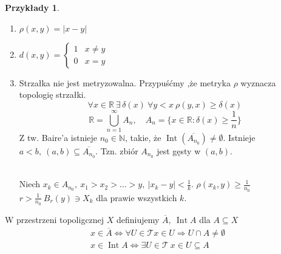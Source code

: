 \documentclass[twoside,10pt]{article}
\theoremstyle{definition}
\theoremstyle{definition}
\theoremstyle{definition}
\theoremstyle{definition}
\theoremstyle{remark}
\theoremstyle{definition}
\theoremstyle{definition}
\theoremstyle{definition}
\theoremstyle{definition}
\theoremstyle{definition}
\newtheorem*{przy}{Przykłady}
\theoremstyle{definition}
\begin{document}
\begin{przy} \hfill
    \begin{enumerate}[(1)]
        \item $\rho (x,y) = |x-y|$
        \item $d(x,y) = \begin{cases} 1 & x \neq y \\ 0 &x = y \end{cases}$
        \item Strzałka nie jest metryzowalna. Przypuśćmy ,że metryka $\rho$ wyznacza topologię strzałki. 
            \[ \forall x \in \mathbb R \ \exists \, \delta(x) \ \forall y < x \ \rho (y,x) \ge \delta (x)\]
            \[ \mathbb R = \bigcup^\infty_{n=1} A_n, \quad A_n = \{ x \in \mathbb R : \delta(x) \ge \frac{1}{n} \} \]
            Z tw. Baire'a istnieje $n_0 \in \mathbb N$, takie, że $\operatorname{Int}(\overline{A_{n_0}}) \neq 
            \emptyset$. Istnieje $a < b, \ (a,b) \subseteq \overline{A_{n_0}}$. Tzn. zbiór 
            $A_{n_0}$ jest gęsty w $(a,b)$.\\[1cm]
             \\[1cm] 
            Niech $x_k \in A_{n_0},\ x_1 > x_2 > \ldots > y,\ |x_k - y| < \frac{1}{k}$. 
            $\rho(x_k,y) \ge \frac{1}{n_0}$ \\ 
            $r > \frac{1}{n_0} \ B_r (y) \ni X_k$ dla prawie wszystkich $k$.
    \end{enumerate} 
\end{przy} 
\begin{df} 
    W przestrzeni topoligcznej $X$ definiujemy $\overline A,\ \operatorname{Int} A$ dla $A \subseteq X$
    \begin{gather*} 
        x \in \overline A \Leftrightarrow \forall U \in \mathcal T x \in U \Rightarrow U \cap A \neq \emptyset \\ 
        x \in \operatorname{Int} A \Leftrightarrow \exists U \in \mathcal T \ x \in U \subseteq A
    \end{gather*} 
\end{df} 
\end{document}
